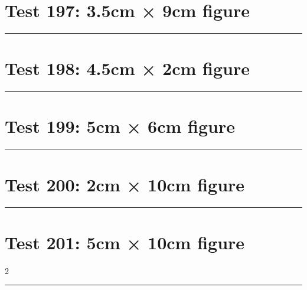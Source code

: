 \documentclass[a4paper,11pt]{article}
\begin{document}
\section*{Test 197: 3.5cm × 9cm figure}
\begin{swarmwrap}%
  \begin{minipage}[t]{3cm}
    \centering
    \rule{\linewidth}{9cm}
  \end{minipage}%
\end{swarmwrap}%
\swarmwrapnext
\lipsum[149]
\lipsum[150]
\lipsum[1]
\section*{Test 198: 4.5cm × 2cm figure}
\begin{swarmwrap}%
  \begin{minipage}[t]{4cm}
    \centering
    \rule{\linewidth}{2cm}
  \end{minipage}%
\end{swarmwrap}%
\swarmwrapnext
\lipsum[40]
\lipsum[41]
\lipsum[42]
\lipsum[43]
\section*{Test 199: 5cm × 6cm figure}
\begin{swarmwrap}%
  \begin{minipage}[t]{5cm}
    \centering
    \rule{\linewidth}{6cm}
  \end{minipage}%
\end{swarmwrap}%
\swarmwrapnext
\lipsum[65]
\lipsum[66]
\lipsum[67]
\section*{Test 200: 2cm × 10cm figure}
\begin{swarmwrap}%
  \begin{minipage}[t]{2cm}
    \centering
    \rule{\linewidth}{10cm}
  \end{minipage}%
\end{swarmwrap}%
\swarmwrapnext
\lipsum[59]
\lipsum[60]
\lipsum[61]
\lipsum[62]
\lipsum[63]
\lipsum[64]
\section*{Test 201: 5cm × 10cm figure}
\begin{multicols}{2}
  \begin{swarmwrap}%
    \begin{minipage}[t]{5cm}
      \centering
      \rule{\linewidth}{10cm}
    \end{minipage}%
  \end{swarmwrap}%
  \swarmwrapnext
  \lipsum[117]
  \lipsum[118]
  \lipsum[119]
  \lipsum[120]
  \lipsum[121]
  \lipsum[122]
\end{multicols}
\end{document}
